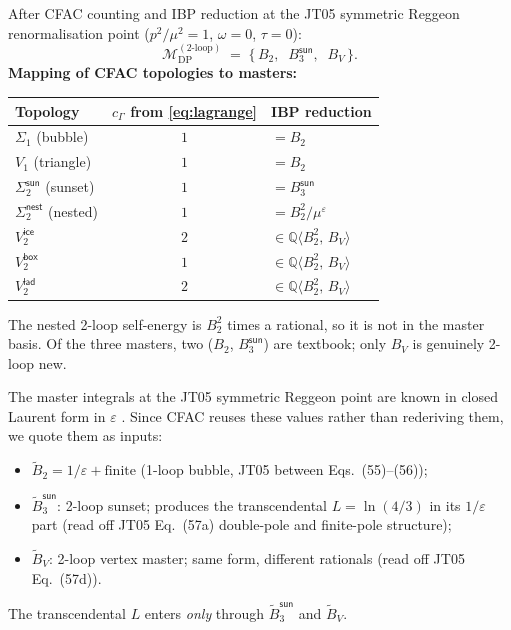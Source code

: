 \documentclass[11pt,a4paper]{article}
\newcommand{\DP}{\textrm{DP}}
\newcommand{\Llog}{\ln(4/3)}
\theoremstyle{definition}
\theoremstyle{plain}
\begin{document}
\begin{cfacbox}
After CFAC counting and IBP reduction at the JT05 symmetric Reggeon
renormalisation point ($p^2/\mu^2 = 1$, $\omega = 0$, $\tau = 0$):
\begin{equation}\label{eq:masters}
  \boxed{\;
  \mathcal{M}_{\DP}^{(2\text{-loop})}
  \;=\;
  \bigl\{\, B_2,\;\; B_3^{\textsf{sun}},\;\; B_V \,\bigr\}.
  \;}
\end{equation}
\textbf{Mapping of CFAC topologies to masters:}
\begin{center}
\begin{tabular}{@{}lcl@{}}
\toprule
Topology & $c_\Gamma$ from \eqref{eq:lagrange} & IBP reduction \\
\midrule
$\Sigma_1$ (bubble) & $1$ & $= B_2$ \\
$V_1$ (triangle) & $1$ & $= B_2$ \\
$\Sigma_2^{\textsf{sun}}$ (sunset) & $1$ & $= B_3^{\textsf{sun}}$ \\
$\Sigma_2^{\textsf{nest}}$ (nested) & $1$ & $= B_2^2 / \mu^\varepsilon$ \\
$V_2^{\textsf{ice}}$ & $2$ & $\in \mathbb{Q}\langle B_2^2,\,B_V \rangle$ \\
$V_2^{\textsf{box}}$ & $1$ & $\in \mathbb{Q}\langle B_2^2,\,B_V \rangle$ \\
$V_2^{\textsf{lad}}$ & $2$ & $\in \mathbb{Q}\langle B_2^2,\,B_V \rangle$ \\
\bottomrule
\end{tabular}
\end{center}
The nested 2-loop self-energy is $B_2^2$ times a rational, so it
is not in the master basis.  Of the three masters, two
($B_2$, $B_3^{\textsf{sun}}$) are textbook; only $B_V$ is genuinely
2-loop new.
\end{cfacbox}

\begin{stdbox}
The master integrals at the JT05 symmetric Reggeon point are known
in closed Laurent form in $\varepsilon$ \cite{JanssenTauber2005,Tauber2014}.
Since CFAC reuses these values rather than rederiving them, we quote
them as inputs:
\begin{itemize}[leftmargin=2em]
  \item $\tilde B_2 = 1/\varepsilon + \text{finite}$
    (1-loop bubble, JT05 between Eqs.~(55)--(56));
  \item $\tilde B_3^{\textsf{sun}}$: 2-loop sunset; produces the
    transcendental $L = \Llog$ in its $1/\varepsilon$ part (read off
    JT05 Eq.~(57a) double-pole and finite-pole structure);
  \item $\tilde B_V$: 2-loop vertex master; same form, different
    rationals (read off JT05 Eq.~(57d)).
\end{itemize}
The transcendental $L$ enters \emph{only} through
$\tilde B_3^{\textsf{sun}}$ and $\tilde B_V$.
\end{stdbox}
\end{document}
